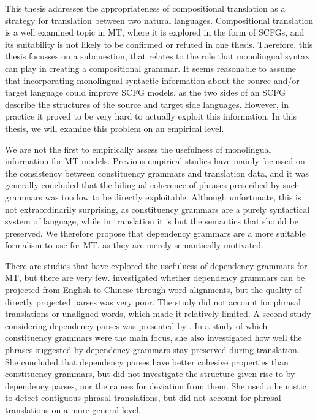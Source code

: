 This thesis addresses the appropriateness of compositional translation as a strategy for translation between two natural languages. Compositional translation is a well examined topic in MT, where it is explored in the form of SCFGs, and its suitability is not likely to be confirmed or refuted in one thesis. Therefore, this thesis focusses on a subquestion, that relates to the role that monolingual syntax can play in creating a compositional grammar. It seems reasonable to assume that incorporating monolingual syntactic information about the source and/or target language could improve SCFG models, as the two sides of an SCFG describe the structures of the source and target side languages. However, in practice it proved to be very hard to actually exploit this information. In this thesis, we will examine this problem on an empirical level.

We are not the first to empirically assess the usefulness of monolingual information for MT models. Previous empirical studies have mainly focussed on the consistency between constituency grammars and translation data, and it was generally concluded that the bilingual coherence of phrases prescribed by such grammars was too low to be directly exploitable. Although unfortunate, this is not extraordinarily surprising, as constituency grammars are a purely syntactical system of language, while in translation it is but the semantics that should be preserved. We therefore propose that dependency grammars are a more suitable formalism to use for MT, as they are merely semantically motivated.

There are studies that have explored the usefulness of dependency grammars for MT, but there are very few. \cite{hwa2002evaluating} investigated whether dependency grammars can be projected from English to Chinese through word alignments, but the quality of directly projected parses was very poor. The study did not account for phrasal translations or unaligned words, which made it relatively limited. A second study considering dependency parses was presented by \cite{fox2002phrasal}. In a study of which constituency grammars were the main focus, she also investigated how well the phrases suggested by dependency grammars stay preserved during translation. She concluded that dependency parses have better cohesive properties than constituency grammars, but did not investigate the structure given rise to by dependency parses, nor the causes for deviation from them. She used a heuristic to detect contiguous phrasal translations, but did not account for phrasal translations on a more general level.
 
